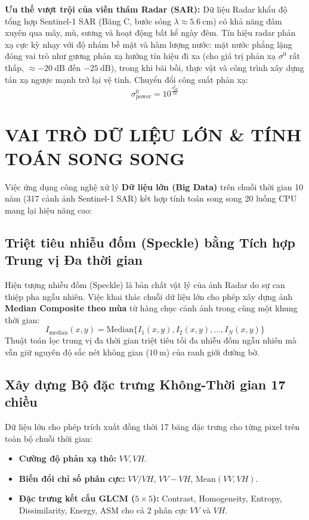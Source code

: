 \documentclass[11pt,a4paper]{article}
\begin{document}
\textbf{Ưu thế vượt trội của viễn thám Radar (SAR):} Dữ liệu Radar khẩu độ tổng hợp Sentinel-1 SAR (Băng C, bước sóng $\lambda \approx 5.6~\text{cm}$) có khả năng đâm xuyên qua mây, mù, sương và hoạt động bất kể ngày đêm. Tín hiệu radar phản xạ cực kỳ nhạy với độ nhám bề mặt và hàm lượng nước: mặt nước phẳng lặng đóng vai trò như gương phản xạ hướng tín hiệu đi xa (cho giá trị phản xạ $\sigma^0$ rất thấp, $\approx -20~\text{dB}$ đến $-25~\text{dB}$), trong khi bãi bồi, thực vật và công trình xây dựng tán xạ ngược mạnh trở lại vệ tinh. Chuyển đổi công suất phản xạ:
\begin{equation}
\sigma^0_{\text{power}} = 10^{\frac{\sigma^0_{\text{dB}}}{10}}
\end{equation}

\section{VAI TRÒ DỮ LIỆU LỚN \& TÍNH TOÁN SONG SONG}

Việc ứng dụng công nghệ xử lý \textbf{Dữ liệu lớn (Big Data)} trên chuỗi thời gian 10 năm (317 cảnh ảnh Sentinel-1 SAR) kết hợp tính toán song song 20 luồng CPU mang lại hiệu năng cao:

\subsection{Triệt tiêu nhiễu đốm (Speckle) bằng Tích hợp Trung vị Đa thời gian}
Hiện tượng nhiễu đốm (Speckle) là bản chất vật lý của ảnh Radar do sự can thiệp pha ngẫu nhiên. Việc khai thác chuỗi dữ liệu lớn cho phép xây dựng ảnh \textbf{Median Composite theo mùa} từ hàng chục cảnh ảnh trong cùng một khung thời gian:
\begin{equation}
I_{\text{median}}(x,y) = \text{Median} \{ I_1(x,y), I_2(x,y), \dots, I_N(x,y) \}
\end{equation}
Thuật toán lọc trung vị đa thời gian triệt tiêu tối đa nhiễu đốm ngẫu nhiên mà vẫn giữ nguyên độ sắc nét không gian ($10~\text{m}$) của ranh giới đường bờ.

\subsection{Xây dựng Bộ đặc trưng Không-Thời gian 17 chiều}
Dữ liệu lớn cho phép trích xuất đồng thời 17 băng đặc trưng cho từng pixel trên toàn bộ chuỗi thời gian:
\begin{itemize}
    \item \textbf{Cường độ phản xạ thô:} $VV, VH$.
    \item \textbf{Biến đổi chỉ số phân cực:} $VV/VH$, $VV-VH$, $\text{Mean}(VV, VH)$.
    \item \textbf{Đặc trưng kết cấu GLCM ($5\times5$):} Contrast, Homogeneity, Entropy, Dissimilarity, Energy, ASM cho cả 2 phân cực $VV$ và $VH$.
\end{itemize}
\end{document}
